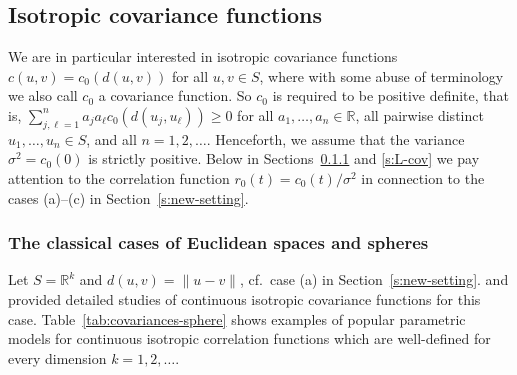 \documentclass[alpha-refs]{wiley-article}
\begin{document}
\subsection{Isotropic covariance functions}\label{s:iso-cov-fct}

We are in particular interested in isotropic covariance functions %
$c(u,v)=c_0(d(u,v))$ for all $u,v\in S$, where 
 with some abuse of terminology we also call $c_0$ a covariance function. So $c_0$ is required to be positive definite, that is, $\sum_{j,\ell=1}^n a_j{a_\ell}c_0(d(u_j,u_\ell))\ge0$ for all $a_1,\ldots,a_n\in\mathbb R$, all pairwise distinct $u_1,\ldots,u_n\in S$, and all $n=1,2,\ldots$. 
 Henceforth, we assume that the variance $\sigma^2=c_0(0)$ is strictly positive. Below in Sections~\ref{s:classical} and \ref{s:L-cov} we pay attention to the correlation function $r_0(t)=c_0(t)/\sigma^2$ in connection to the cases (a)--(c) in Section~\ref{s:new-setting}. 

\subsubsection{The classical cases of Euclidean spaces and spheres}\label{s:classical}

Let $S=\mathbb R^k$ and $d(u,v)=\|u-v\|$, cf.\ case (a) in Section~\ref{s:new-setting}. %
\citet{Schoenberg38} and \citet{Gneiting01} provided detailed studies of continuous isotropic covariance functions for this case. 
Table~\ref{tab:covariances-sphere} shows
examples of popular parametric models for continuous isotropic correlation functions which are well-defined for every dimension $k=1,2,\ldots$. 
\end{document}
